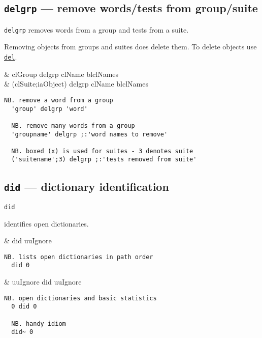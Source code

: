\subsection{\texttt{delgrp} ---  remove words/tests from group/suite}

\texttt{delgrp} removes words from a group and tests from a suite.  

Removing objects from groups and suites does delete them. To delete objects use 
\hyperlink{il:del}{\texttt{del}}.

\begin{wordhead}
\dyad & clGroup delgrp clName \argsep blclNames \\
      & (clSuite;iaObject) delgrp clName \argsep blclNames \\
\end{wordhead}
\begin{lstlisting}[frame=single,framerule=0pt]
  NB. remove a word from a group
  'group' delgrp 'word' 

  NB. remove many words from a group 
  'groupname' delgrp ;:'word names to remove'

  NB. boxed (x) is used for suites - 3 denotes suite
  ('suitename';3) delgrp ;:'tests removed from suite'
\end{lstlisting}

 
\subsection{\texttt{did} --- dictionary identification}\label{ss:did}

\hypertarget{il:did}{\texttt{did}} identifies open dictionaries. 

\begin{wordhead}
\monad & did uuIgnore \\
\end{wordhead}
\begin{lstlisting}[frame=single,framerule=0pt]
  NB. lists open dictionaries in path order 
  did 0 
\end{lstlisting}

\begin{wordhead}
\dyad & uuIgnore did uuIgnore \\
\end{wordhead}
\begin{lstlisting}[frame=single,framerule=0pt]
  NB. open dictionaries and basic statistics 
  0 did 0  

  NB. handy idiom 
  did~ 0    
\end{lstlisting}

